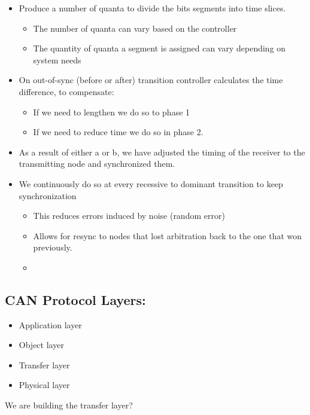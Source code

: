 \begin{itemize}
\item
  Produce a number of quanta to divide the bits\textquotesingle{}
  segments into time slices.

  \begin{itemize}
  \item
    The number of quanta can vary based on the controller
  \item
    The quantity of quanta a segment is assigned can vary depending on
    system needs
  \end{itemize}
\item
  On out-of-sync (before or after) transition controller calculates the time
  difference, to compensate:

  \begin{itemize}
  \item
    If we need to lengthen we do so to phase 1
  \item
    If we need to reduce time we do so in phase 2.
  \end{itemize}
\item
  As a result of either a or b, we have adjusted the timing of the
  receiver to the transmitting node and synchronized them.
\item
  We continuously do so at every recessive to dominant transition to
  keep synchronization

  \begin{itemize}
  \item
    This reduces errors induced by noise (random error)
  \item
    Allows for resync to nodes that lost arbitration back to the one
    that won previously.
  \item
  \end{itemize}
\end{itemize}

\subsection{CAN Protocol Layers:}
\begin{itemize}
    \item Application layer
    \item Object layer
    \item Transfer layer
    \item Physical layer
\end{itemize}


We are building the transfer layer?

